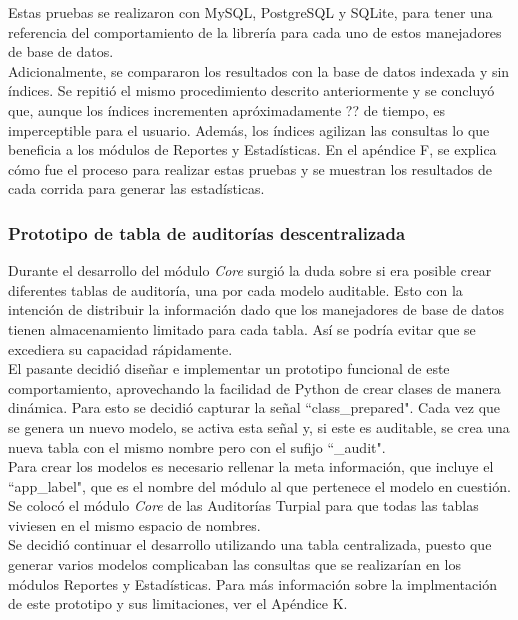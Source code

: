 Estas pruebas se realizaron con MySQL, PostgreSQL y SQLite, para tener una referencia del comportamiento de la librería para cada uno de estos manejadores de base de datos.\\

Adicionalmente, se compararon los resultados con la base de datos indexada y sin índices. Se repitió el mismo procedimiento descrito anteriormente y se concluyó que, aunque los índices incrementen apróximadamente ?? de tiempo, es imperceptible para el usuario. Además, los índices agilizan las consultas lo que beneficia a los módulos de Reportes y Estadísticas. En el apéndice F, se explica cómo fue el proceso para realizar estas pruebas y se muestran los resultados de cada corrida para generar las estadísticas.

\subsubsection{Prototipo de tabla de auditorías descentralizada}

Durante el desarrollo del módulo \textit{Core} surgió la duda sobre si era posible crear diferentes tablas de auditoría, una por cada modelo auditable. Esto con la intención de distribuir la información dado que los manejadores de base de datos tienen almacenamiento limitado para cada tabla. Así se podría evitar que se excediera su capacidad rápidamente. \\

El pasante decidió diseñar e implementar un prototipo funcional de este comportamiento, aprovechando la facilidad de Python de crear clases de manera dinámica. Para esto se decidió capturar la señal “class\_prepared". Cada vez que se genera un nuevo modelo, se activa esta señal y, si este es auditable, se crea una nueva tabla con el mismo nombre pero con el sufijo “\_audit". \\

Para crear los modelos es necesario rellenar la meta información, que incluye el “app\_label", que es el nombre del módulo al que pertenece el modelo en cuestión. Se colocó el módulo \textit{Core} de las Auditorías Turpial para que todas las tablas viviesen en el mismo espacio de nombres.\\

Se decidió continuar el desarrollo utilizando una tabla centralizada, puesto que generar varios modelos complicaban las consultas que se realizarían en los módulos Reportes y Estadísticas. Para más información sobre la implmentación de este prototipo y sus limitaciones, ver el Apéndice K.

